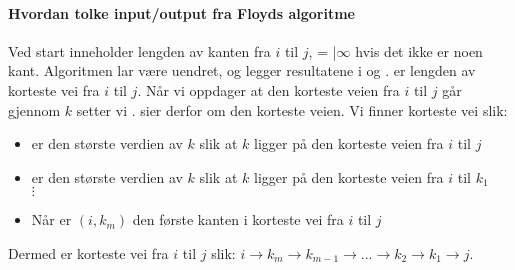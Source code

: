 \paragraph{Hvordan tolke input/output fra Floyds algoritme}
Ved start inneholder  lengden av kanten fra $ i $ til $ j $, = |$ \infty $ hvis det ikke er noen kant. Algoritmen lar  være uendret, og legger resultatene i  og .  er lengden av korteste vei fra $ i $ til $ j $. Når vi oppdager at den korteste veien fra $ i $ til $ j $ går gjennom $ k $ setter vi .  sier derfor om den korteste veien. Vi finner korteste vei slik:
\begin{itemize}
\item {} er den største verdien av $ k $ slik at $ k $ ligger på den korteste veien fra $ i $ til $ j $
\item {} er den største verdien av $ k $ slik at $ k $ ligger på den korteste veien fra $ i $ til $ k_1 $
\\ $ \vdots $
\item Når  er $ (i, k_m) $ den første kanten i korteste vei fra $ i $ til $ j $
\end{itemize}
Dermed er korteste vei fra $ i $ til $ j $ slik: $ i \rightarrow k_m \rightarrow k_{m-1} \rightarrow ... \rightarrow k_2 \rightarrow k_1 \rightarrow j $. 